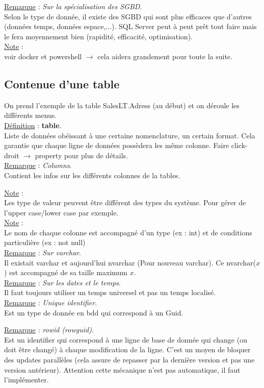 \documentclass[a4paper,12pt,twoside]{article}
\newcommand{\rem}[2]{\noindent\underline{Remarque} : \textit{#1}.\\ \indent #2}
\newcommand{\note}[1]{\noindent\underline{Note} : \\ \indent #1}
\newcommand{\defi}[2]{\noindent\underline{Définition} : \textbf{#1}.\\ \indent #2}
\begin{document}
\rem{Sur la spécialisation des SGBD}{Selon le type de donnée, il existe des SGBD qui sont plus efficaces que d'autres (données temps, données espace,...). SQL Server peut à peut prêt tout faire mais le fera moyennement bien (rapidité, efficacité, optimisation).}\\

\note{voir docker et powershell $\to$ cela aidera grandement pour toute la suite.}\\

\subsection{Contenue d'une table}

On prend l'exemple de la table SalesLT.Adress (au début) et on déroule les différents menus. \\

\defi{table}{Liste de données obéissant à une certaine nomenclature, un certain format. Cela garantie que chaque ligne de données possèdera les même colonne. Faire click-droit $\to$ property pour plus de détails.}\\

\rem{Columns}{Contient les infos sur les différents colonnes de la tables.}

\note{Les type de valeur peuvent être différent des types du système. Pour gérer de l'upper case/lower case par exemple.}\\

\note{Le nom de chaque colonne est accompagné d'un type (ex : int) et de conditions particulière (ex : not null)}\\

\rem{Sur varchar}{Il existait varchar et aujourd'hui nvarchar (Pour nouveau varchar). Ce nvarchar($x$) est accompagné de sa taille maximum $x$.}\\

\rem{Sur les dates et le temps}{Il faut toujours utiliser un temps universel et pas un temps localisé.}\\

\rem{Unique identifier}{Est un type de donnée en bdd qui correspond à un Guid.}

\rem{rowid (rowguid)}{Est un identifier qui correspond à une ligne de base de donnée qui change (ou doit être changé) à chaque modification de la ligne. C'est un moyen de bloquer des updates parallèles (cela assure de repasser par la dernière version et pas une version antérieur). Attention cette mécanique n'est pas automatique, il faut l'implémenter.}\\
\end{document}
